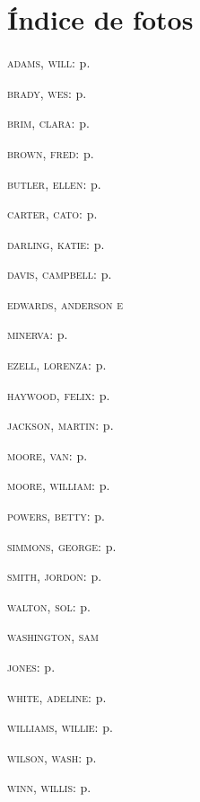 \bigskip

\section{Índice de fotos}

\begin{multicols}{2}[]
{\small{
\textsc{adams, will:} p.~\pageref{img14}

\textsc{brady, wes:} p.~\pageref{img15}

\textsc{brim, clara:} p.~\pageref{img4}

\textsc{brown, fred:} p.~\pageref{img12}

\textsc{butler, ellen:} p.~\pageref{img18}

\textsc{carter, cato:} p.~\pageref{img10}

\textsc{darling, katie:} p.~\pageref{img1}

\textsc{davis, campbell:} p.~\pageref{img6}

\textsc{edwards, anderson e} 

\textsc{minerva:} p.~\pageref{img16}

\textsc{ezell, lorenza:} p.~\pageref{img7}

\textsc{haywood, felix:} p.~\pageref{img21}

\textsc{jackson, martin:} p.~\pageref{img13}

\textsc{moore, van:} p.~\pageref{img22}

\textsc{moore, william:} p.~\pageref{img19}

\textsc{powers, betty:} p.~\pageref{img11}

\textsc{simmons, george:} p.~\pageref{img5}

\textsc{smith, jordon:} p.~\pageref{img2}

\textsc{walton, sol:} p.~\pageref{img3}

\textsc{washington, sam}

\textsc{jones:} p.~\pageref{img8}

\textsc{white, adeline:} p.~\pageref{img23}

\textsc{williams, willie:} p.~\pageref{img20}

\textsc{wilson, wash:} p.~\pageref{img17}

\textsc{winn, willis:} p.~\pageref{img9}
}}
\end{multicols}
